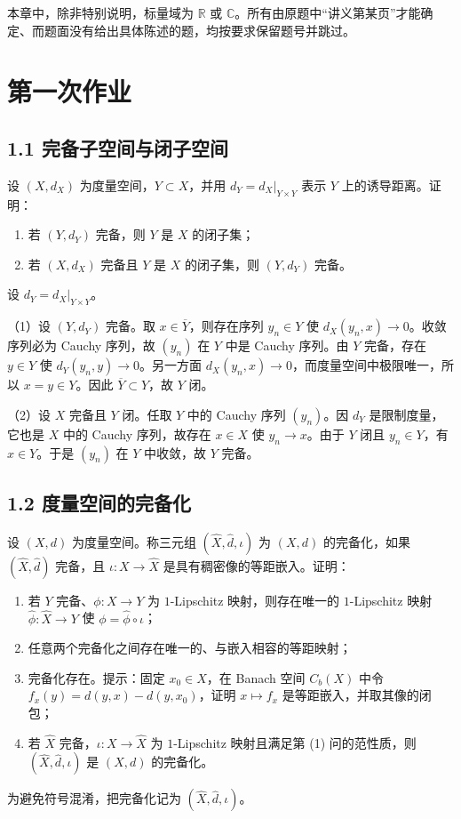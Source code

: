 本章中，除非特别说明，标量域为 $\mathbb R$ 或 $\mathbb C$。所有由原题中“讲义第某页”才能确定、而题面没有给出具体陈述的题，均按要求保留题号并跳过。

\section{第一次作业}

\subsection*{1.1 完备子空间与闭子空间}
\begin{problem}
设 $(X,d_X)$ 为度量空间，$Y\subset X$，并用 $d_Y=d_X|_{Y\times Y}$ 表示 $Y$ 上的诱导距离。证明：
\begin{enumerate}[label=(\arabic*)]
\item 若 $(Y,d_Y)$ 完备，则 $Y$ 是 $X$ 的闭子集；
\item 若 $(X,d_X)$ 完备且 $Y$ 是 $X$ 的闭子集，则 $(Y,d_Y)$ 完备。
\end{enumerate}
\end{problem}
设 $d_Y=d_X|_{Y\times Y}$。

（1）设 $(Y,d_Y)$ 完备。取 $x\in\overline Y$，则存在序列 $y_n\in Y$ 使 $d_X(y_n,x)\to0$。收敛序列必为 Cauchy 序列，故 $(y_n)$ 在 $Y$ 中是 Cauchy 序列。由 $Y$ 完备，存在 $y\in Y$ 使 $d_Y(y_n,y)\to0$。另一方面 $d_X(y_n,x)\to0$，而度量空间中极限唯一，所以 $x=y\in Y$。因此 $\overline Y\subset Y$，故 $Y$ 闭。

（2）设 $X$ 完备且 $Y$ 闭。任取 $Y$ 中的 Cauchy 序列 $(y_n)$。因 $d_Y$ 是限制度量，它也是 $X$ 中的 Cauchy 序列，故存在 $x\in X$ 使 $y_n\to x$。由于 $Y$ 闭且 $y_n\in Y$，有 $x\in Y$。于是 $(y_n)$ 在 $Y$ 中收敛，故 $Y$ 完备。

\subsection*{1.2 度量空间的完备化}
\begin{problem}
设 $(X,d)$ 为度量空间。称三元组 $(\widehat X,\widehat d,\iota)$ 为 $(X,d)$ 的完备化，如果 $(\widehat X,\widehat d)$ 完备，且 $\iota:X\to\widehat X$ 是具有稠密像的等距嵌入。证明：
\begin{enumerate}[label=(\arabic*)]
\item 若 $Y$ 完备、$\phi:X\to Y$ 为 $1$-Lipschitz 映射，则存在唯一的 $1$-Lipschitz 映射 $\widehat\phi:\widehat X\to Y$ 使 $\phi=\widehat\phi\circ\iota$；
\item 任意两个完备化之间存在唯一的、与嵌入相容的等距映射；
\item 完备化存在。提示：固定 $x_0\in X$，在 Banach 空间 $C_b(X)$ 中令
$f_x(y)=d(y,x)-d(y,x_0)$，证明 $x\mapsto f_x$ 是等距嵌入，并取其像的闭包；
\item 若 $\widehat X$ 完备，$\iota:X\to\widehat X$ 为 $1$-Lipschitz 映射且满足第 (1) 问的范性质，则 $(\widehat X,\widehat d,\iota)$ 是 $(X,d)$ 的完备化。
\end{enumerate}
\end{problem}
为避免符号混淆，把完备化记为 $(\widehat X,\widehat d,\iota)$。

